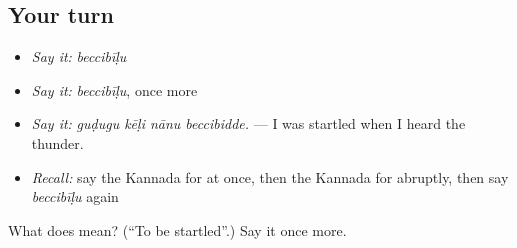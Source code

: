 \subsection*{Your turn}
\begin{itemize}
\raggedright
  \item \emph{Say it:} \emph{beccibīḷu}
  \item \emph{Say it:} \emph{beccibīḷu}, once more
  \item \emph{Say it:} \emph{guḍugu kēḷi nānu beccibidde.} — I was startled when I heard the thunder.
  \item \emph{Recall:} say the Kannada for at once, then the Kannada for abruptly, then say \emph{beccibīḷu} again
\end{itemize}

\begin{tcolorbox}[breakable,colback=teal!4,colframe=teal!35!black,title={Before you move on}]
What does  mean? (\textquotedblleft{}To be startled\textquotedblright{}.) Say it once more.
\end{tcolorbox}
